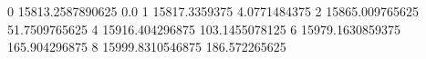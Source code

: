 0 15813.2587890625 0.0
1 15817.3359375 4.0771484375
2 15865.009765625 51.7509765625
4 15916.404296875 103.1455078125
6 15979.1630859375 165.904296875
8 15999.8310546875 186.572265625
